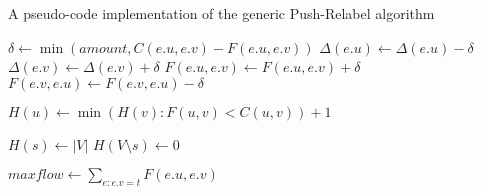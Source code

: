 \documentclass[10pt,a4paper,hidelinks]{article}
\begin{document}
\begin{algorithm}
\caption{A pseudo-code implementation of the generic Push-Relabel algorithm}
\label{algo:push-relabel}

\begin{algorithmic}
	\State $\delta \gets \min(amount, C(e.u, e.v) - F(e.u, e.v))$
	\State $\Delta(e.u) \gets \Delta(e.u) - \delta$
	\State $\Delta(e.v) \gets \Delta(e.v) + \delta$
	\State $F(e.u, e.v) \gets F(e.u, e.v) + \delta$
	\State $F(e.v, e.u) \gets F(e.v, e.u) - \delta$
\EndFunction

\State

	\State $H(u) \gets \min(H(v) : F(u, v) < C(u, v)) + 1$
\EndFunction

\State

	\State {}
\EndFor

\State

\State $H(s) \gets |V|$
\State $H(V \setminus s) \gets 0$

\State

		\State {}
	\Else
		\State {}
	\EndIf
\EndWhile

\State

\State $maxflow \gets \sum\limits_{e : e.v = t} F(e.u, e.v)$
\end{algorithmic}
\end{algorithm}



\end{document}
